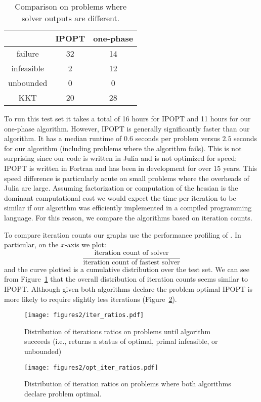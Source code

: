 \documentclass{article}
\begin{document}
\begin{table}[H]
\caption{Comparison on problems where solver outputs are different.}\label{compare-outputs}
\begin{tabular}{| c | c | c |}
& IPOPT & one-phase \\
\hline
failure &  32 & 14 \\ 
infeasible & 2 & 12 \\  
unbounded & 0 & 0 \\
KKT & 20 & 28 
\end{tabular}
\end{table}

To run this test set it takes a total of 16 hours for IPOPT and 11 hours for our one-phase algorithm. However, IPOPT is generally significantly faster than our algorithm. It has a median runtime of $0.6$ seconds per problem versus $2.5$ seconds for our algorithm (including problems where the algorithm fails). This is not surprising since our code is written in Julia and is not optimized for speed; IPOPT is written in Fortran and has been in development for over 15 years. This speed difference is particularly acute on small problems where the overheads of Julia are large. Assuming factorization or computation of the hessian is the dominant computational cost we would expect the time per iteration to be similar if our algorithm was efficiently implemented in a compiled programming language. For this reason, we compare the algorithms based on iteration counts.

To compare iteration counts our graphs use the performance profiling of \citet*{dolan2002benchmarking}. In particular, on the $x$-axis we plot:
$$
\frac{\text{iteration count of solver}}{\text{iteration count of fastest solver}}
$$
and the curve plotted is a cumulative distribution over the test set. We can see from Figure~\ref{fig:iter-count-CUTEst} that the overall distribution of iteration counts seems similar to IPOPT. Although given both algorithms declare the problem optimal IPOPT is more likely to require slightly less iterations (Figure~\ref{fig:iter-count-CUTEst-opt}).

\begin{figure}[H]
\texttt{[image: figures2/iter\_ratios.pdf]}
\caption{Distribution of iterations ratios on problems until algorithm succeeds (i.e., returns a status of optimal, primal infeasible, or unbounded)}\label{fig:iter-count-CUTEst}
\end{figure}

\begin{figure}[H]
\texttt{[image: figures2/opt\_iter\_ratios.pdf]}
\caption{Distribution of iteration ratios on problems where both algorithms declare problem optimal.}\label{fig:iter-count-CUTEst-opt}
\end{figure}
\end{document}
